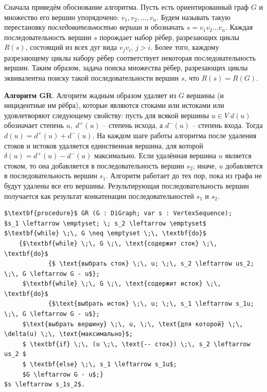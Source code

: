 \documentclass[spec, och, otchet, hidelinks]{SCWorks}
\begin{document}
\par Сначала приведём обоснование алгоритма. Пусть есть ориентированный граф $G$ и множество его вершин упорядочено: $v_1, v_2, \dots, v_n$. Будем 
называть такую перестановку \textit{последовательностью вершин} и обозначать $s = v_1v_2\dots v_n$. Каждая последовательность вершин $s$ порождает 
набор рёбер, разрезающих циклы $R(s)$, состоящий из всех дуг вида $v_jv_i, \, j > i$. Более того, каждому разрезающему циклы набору рёбер соответствует
некоторая последовательность вершин. Таким образом, задача поиска множества рёбер, разрезающих циклы эквивалентна поиску такой последовательности вершин $s$, что $R(s) = R(G)$.

\par \textbf{Алгоритм GR}. Алгоритм жадным образом удаляет из $G$ вершины (и инцидентные им рёбра), которые являются стоками или истоками или 
удовлетворяют следующему свойству: пусть для всякой вершины $u \in V \; d(u)$ обозначает степень $u, \; d^{+}(u) $ -- степень исхода, а $d^{-}(u)$ -- 
степень входа. Тогда $d(u) = d^{+}(u) + d^{-}(u)$. На каждом шаге работы алгоритма после удаления стоков и истоков удаляется единственная вершина, для 
которой $\delta(u) = d^{+}(u) - d^{-}(u)$ максимально. Если удалённая вершина $u$ является стоком, то она добавляется в последовательность вершин $s_2$;
иначе, $u$ добавляется в последовательность вершин $s_1$. Алгоритм работает до тех пор, пока из графа не будут удалены все его вершины. Результирующая
последовательность вершин получается как результат конкатенации последовательностей $s_1$ и $s_2$.

\begin{lstlisting}[caption=Алгоритм GR.,style=listingStyle, mathescape=true]
$\textbf{procedure}$ GR (G : DiGraph; var s : VertexSequence);
$s_1 \leftarrow \emptyset; \; s_2 \leftarrow \emptyset$
$\textbf{while} \;\, G \neq \emptyset \;\, \textbf{do}$
	{$\textbf{while} \;\, G \;\, \text{содержит сток} \;\, \textbf{do}$
			{$ \text{выбрать сток} \;\, u; \;\, s_2 \leftarrow us_2; \;\, G \leftarrow G - u$};
	 $\textbf{while} \;\, G \;\, \text{содержит исток} \;\, \textbf{do}$
	 		{$\text{выбрать исток} \;\, u; \;\, s_1 \leftarrow s_1u; \;\, G \leftarrow G - u$};
	 $\text{выбрать вершину} \;\, u, \;\, \text{для которой} \;\, \delta(u) \;\, \text{максимально}$;
	 $ \textbf{if} \;\, (u \;\, \text{-- сток}) \;\, s_2 \leftarrow us_2 $
	 $ \textbf{else} \;\, s_1 \leftarrow s_1u$;
	 $G \leftarrow G - u$;}
$s \leftarrow s_1s_2$.

\end{lstlisting}
\end{document}

